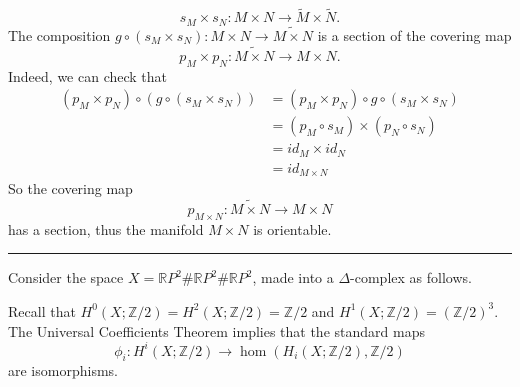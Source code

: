 \documentclass[letterpaper, 12pt]{article}
\begin{document}
\begin{solution}
\begin{enumerate}[(a)]
\[s_M\times s_N:M\times N\rightarrow \tilde{M}\times \tilde{N}.\]
The composition \(g\circ (s_M\times s_N): M\times N\rightarrow \tilde{M\times N}\) is a section of the covering map 
\[p_M\times p_N:\widetilde{M\times N}\rightarrow M\times N.\]
Indeed, we can check that 
\begin{align*}
    (p_M\times p_N)\circ (g\circ (s_M\times s_N))&=(p_M\times p_N)\circ g\circ (s_M\times s_N)\\ 
                                                 &=(p_M\circ s_M)\times (p_N\circ s_N)\\ 
                                                 &=id_M\times id_N\\ 
                                                 &=id_{M\times N}
\end{align*}
So the covering map 
\[p_{M\times N}:\widetilde{M\times N}\rightarrow M\times N\]
has a section, thus the manifold \(M\times N\) is orientable. 
\end{enumerate}
\end{solution}

\noindent\rule{7in}{2.8pt}

\newpage 

Consider the space \(X=\mathbb{R}P^2\#\mathbb{R}P^2\#\mathbb{R}P^2\), made into a \(\Delta\)-complex as follows.
\begin{figure}[h]
    \centering
\end{figure}

Recall that \(H^0(X;\mathbb{Z}/2)=H^2(X;\mathbb{Z}/2)=\mathbb{Z}/2\) and \(H^1(X;\mathbb{Z}/2)=(\mathbb{Z}/2)^3\). The Universal Coefficients Theorem implies that the standard maps
\[\phi_i:H^i(X;\mathbb{Z}/2)\rightarrow \hom(H_i(X;\mathbb{Z}/2),\mathbb{Z}/2)\]
are isomorphisms.
\end{document}
